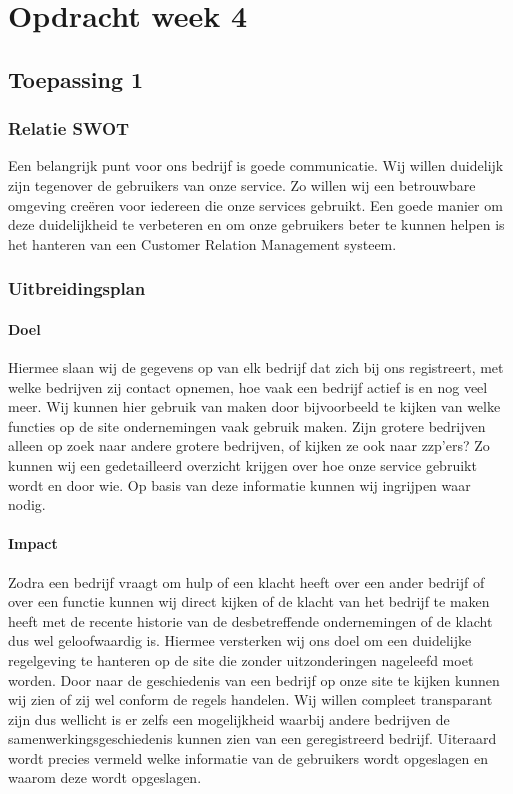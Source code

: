 \chapter{Opdracht week 4}

\section{Toepassing 1}


\subsection{Relatie SWOT}

Een belangrijk punt voor ons bedrijf is goede communicatie.
Wij willen duidelijk zijn tegenover de gebruikers van onze service.
Zo willen wij een betrouwbare omgeving creëren voor iedereen die onze services gebruikt.
Een goede manier om deze duidelijkheid te verbeteren en
om onze gebruikers beter te kunnen helpen is het hanteren van een Customer Relation Management systeem. 

\subsection{Uitbreidingsplan}

\subsubsection{Doel}

Hiermee slaan wij de gegevens op van elk bedrijf dat zich bij ons registreert,
met welke bedrijven zij contact opnemen,
hoe vaak een bedrijf actief is en nog veel meer.
Wij kunnen hier gebruik van maken door bijvoorbeeld te kijken van welke functies op de site ondernemingen vaak gebruik maken.
Zijn grotere bedrijven alleen op zoek naar andere grotere bedrijven, of kijken ze ook naar zzp’ers?
Zo kunnen wij een gedetailleerd overzicht krijgen over hoe onze service gebruikt wordt en door wie.
Op basis van deze informatie kunnen wij ingrijpen waar nodig.

\subsubsection{Impact}

Zodra een bedrijf vraagt om hulp of een klacht heeft over een ander bedrijf of
over een functie kunnen wij direct kijken of de klacht van het bedrijf te maken heeft met de recente historie van de desbetreffende ondernemingen of de klacht dus wel geloofwaardig is.
Hiermee versterken wij ons doel om een duidelijke regelgeving te hanteren op de site die zonder uitzonderingen nageleefd moet worden.
Door naar de geschiedenis van een bedrijf op onze site te kijken kunnen wij zien of zij wel conform de regels handelen.
Wij willen compleet transparant zijn dus wellicht is er zelfs een mogelijkheid waarbij andere bedrijven de samenwerkingsgeschiedenis kunnen zien van een geregistreerd bedrijf.
Uiteraard wordt precies vermeld welke informatie van de gebruikers wordt opgeslagen en waarom deze wordt opgeslagen.


